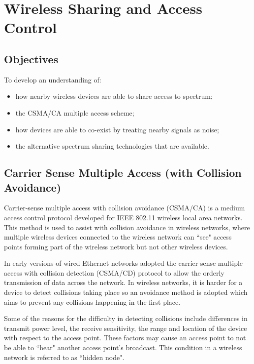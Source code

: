 \chapter{Wireless Sharing and Access Control}\label{waccess}

\minitoc 

\clearpage
\section*{Objectives}
To develop an understanding of:
\begin{itemize}

\item how nearby wireless devices are able to share access to spectrum;

\item the CSMA/CA multiple access scheme;

\item how devices are able to co-exist by treating nearby signals as noise;

\item the alternative spectrum sharing technologies that are available.

\end{itemize}

\section{Carrier Sense Multiple Access (with Collision Avoidance)}\label{CSMA/CA}

Carrier-sense multiple access with collision avoidance (CSMA/CA) is a
medium access control protocol developed for IEEE 802.11 wireless local
area networks.  This method is used to assist with collision avoidance
in wireless networks, where multiple wireless devices connected to the
wireless network can ``see" access points forming part of the wireless
network but not other wireless devices.

In early versions of wired Ethernet networks adopted the carrier-sense
multiple access with collision detection (CSMA/CD) protocol to allow the
orderly transmission of data across the network. In wireless networks, it
is harder for a device to detect collisions taking place so an
avoidance method is adopted which aims to prevent any collisions
happening in the first place.

Some of the reasons for the difficulty in detecting collisions include
differences in transmit power level, the receive sensitivity, the
range and location of the device with respect to the access point. These
factors may cause an access point to not be able to ``hear" another access
point's broadcast. This condition in a wireless network is referred to as
``hidden node".

